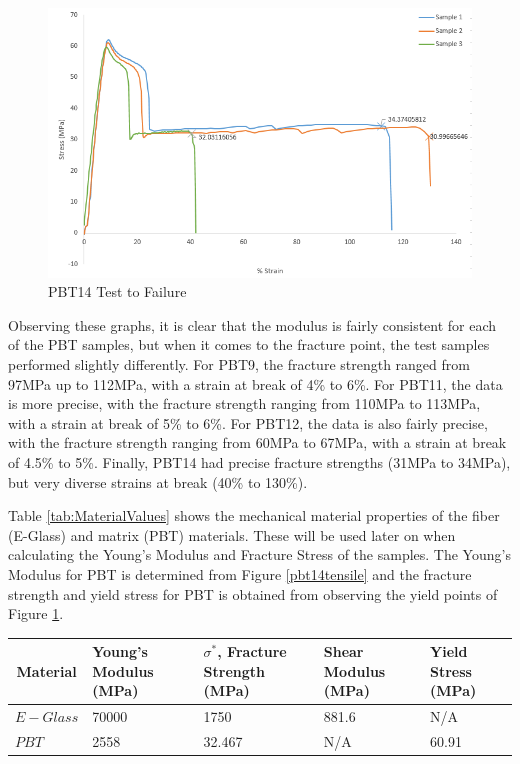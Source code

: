 \documentclass[11pt]{article}
\begin{document}
\begin{figure}[H]
\centering
\includegraphics[width=.95\linewidth]{figures/PBT14_Fail.png}
\caption{PBT14 Test to Failure}
\label{pbt14fail}
\end{figure}

Observing these graphs, it is clear that the modulus is fairly consistent for each of the PBT samples, but when it comes to the fracture point, the test samples performed slightly differently. For PBT9, the fracture strength ranged from 97MPa up to 112MPa, with a strain at break of 4\% to 6\%. For PBT11, the data is more precise, with the fracture strength ranging from 110MPa to 113MPa, with a strain at break of 5\% to 6\%. For PBT12, the data is also fairly precise, with the fracture strength ranging from 60MPa to 67MPa, with a strain at break of 4.5\% to 5\%. Finally, PBT14 had precise fracture strengths (31MPa to 34MPa), but very diverse strains at break (40\% to 130\%).

Table \ref{tab:MaterialValues} shows the mechanical material properties of the fiber (E-Glass) and matrix (PBT) materials. These will be used later on when calculating the Young's Modulus and Fracture Stress of the samples. The Young's Modulus for PBT is determined from Figure \ref{pbt14tensile} and the fracture strength and yield stress for PBT is obtained from observing the yield points of Figure \ref{pbt14fail}.

\onehalfspacing
\begin{center}
 \label{tab:MaterialValues}
\begin{tabular}{p{2cm} || p{2.75cm} | p{2.75cm} | p{2.75cm} | p{2.75cm} }
\hline
\multicolumn{1}{c||}{Material} & Young's Modulus (MPa) & \(\sigma^*\), Fracture Strength (MPa) & Shear Modulus (MPa) & Yield Stress (MPa)\\
\hline
\hline
\(E-Glass\) & 70000 &  1750 & 881.6 & N/A \\
\(PBT\) & 2558 & 32.467 & N/A & 60.91\\
\hline
\end{tabular}
\end{center}
\singlespacing
\end{document}
